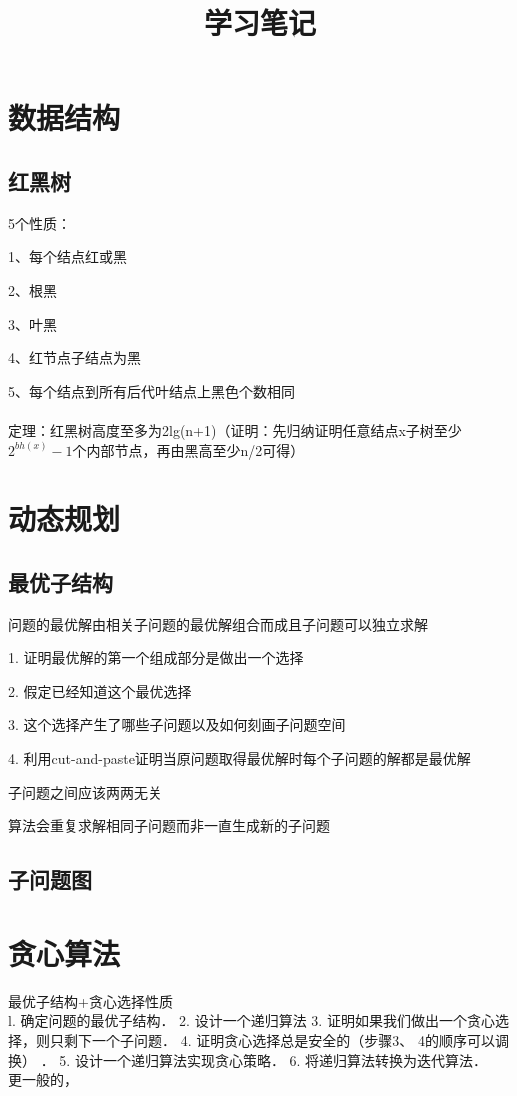 \documentclass[cn,hazy,blue,screen,14pt]{note}
\title{学习笔记}
\author{}
\date{\zhtoday}
\begin{document}
\maketitle
\newpage
\tableofcontents
\newpage
\section{数据结构}
\subsection{红黑树}
5个性质：

1、每个结点红或黑

2、根黑

3、叶黑

4、红节点子结点为黑

5、每个结点到所有后代叶结点上黑色个数相同
\\\\

定理：红黑树高度至多为2lg(n+1)（证明：先归纳证明任意结点x子树至少$2^{bh(x)}-1$个内部节点，再由黑高至少n/2可得）



\newpage
\section{动态规划}
\subsection{最优子结构}
问题的最优解由相关子问题的最优解组合而成且子问题可以独立求解

1. 证明最优解的第一个组成部分是做出一个选择

2. 假定已经知道这个最优选择

3. 这个选择产生了哪些子问题以及如何刻画子问题空间

4. 利用cut-and-paste证明当原问题取得最优解时每个子问题的解都是最优解

子问题之间应该两两无关

算法会重复求解相同子问题而非一直生成新的子问题
\subsection{子问题图}

\newpage

\section{贪心算法}
最优子结构+贪心选择性质
\\
l. 确定问题的最优子结构．
2. 设计一个递归算法
3. 证明如果我们做出一个贪心选择，则只剩下一个子问题．
4. 证明贪心选择总是安全的（步骤3、 4的顺序可以调换） ．
5. 设计一个递归算法实现贪心策略．
6. 将递归算法转换为迭代算法．\\
更一般的，
\end{document}
